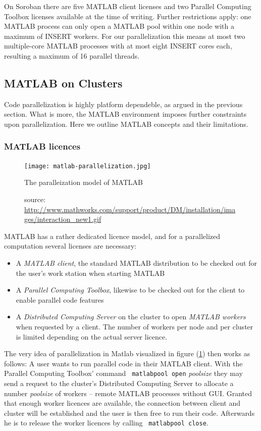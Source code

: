 \documentclass[11.5pt,a4paper]{article}
\begin{document}
On Soroban there are five MATLAB client licenses and two Parallel Computing Toolbox licenses available at the time of writing. Further restrictions apply: one MATLAB process can only open a MATLAB pool within one node with a maximum of INSERT workers. For our parallelization this means at most two multiple-core MATLAB processes with at most eight INSERT cores each, resulting a maximum of 16 parallel threads. 

\subsection{MATLAB on Clusters}
\label{sec-matlab}
Code parallelization is highly platform dependeble, as argued in the previous section. What is more, the MATLAB environment imposes further constraints upon parallelization. Here we outline MATLAB concepts and their limitations.

\subsubsection{MATLAB licences}
\begin{figure}
  \centering
 \texttt{[image: matlab-parallelization.jpg]}
  \caption{The paralleization model of MATLAB}
  \label{fig-matlab-parallelization}
  \caption*{source:  \url{http://www.mathworks.com/support/product/DM/installation/images/interaction_new1.gif}}
\end{figure}
MATLAB has a rather dedicated licence model, and for a parallelized computation several licenses are necessary:
\begin{itemize}
 \item A \emph{MATLAB client}, the standard MATLAB distribution to be checked out for the user's work station when starting MATLAB
\item A \emph{Parallel Computing Toolbox}, likewise to be checked out for the client to enable parallel code features
\item A \emph{Distributed Computing Server} on the cluster to open \emph{MATLAB workers} when requested by a client. The number of workers per node and per cluster is limited depending on the actual server licence.
\end{itemize}
The very idea of parallelization in Matlab visualized in figure (\ref{fig-matlab-parallelization}) then works as follows: A user wants to run parallel code in their MATLAB client. With the Parallel Computing Toolbox' command \verb$ matlabpool open$ \emph{poolsize} they may send a request to the cluster's Distributed Computing Server to allocate a number \emph{poolsize} of workers -- remote MATLAB processes without GUI. Granted that enough worker licences are available, the connection between client and cluster will be established and the user is then free to run their code. Afterwards he is to release the worker licences by calling \verb$ matlabpool close$.
\end{document}
